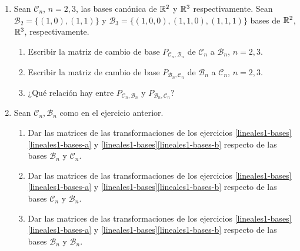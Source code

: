 \begin{enumerate}[topsep=6pt, itemsep=.4cm]
\item\label{otras bases} Sean $\mathcal{C}_n$, $n=2,3$, las bases canónica de $\mathbb R^2$ y $\mathbb R^3$ respectivamente. Sean
$\mathcal{B}_2=\{(1,0),(1,1)\}$ y $\mathcal{B}_3=\{(1,0,0),(1,1,0),(1,1,1)\}$ bases de $\mathbb R^2$, $\mathbb R^3$, respectivamente.
\begin{enumerate}
    \item Escribir la matriz de cambio de base $P_{{\mathcal{C}_n},{\mathcal{B}_n}}$ de $\mathcal{C}_n$ a $\mathcal{B}_n$, $n=2,3$.
    \item Escribir la matriz de cambio de base $P_{{\mathcal{B}_n},{\mathcal{C}_n}}$ de $\mathcal{B}_n$ a $\mathcal{C}_n$, $n=2,3$.
    \item ¿Qué relación hay entre $P_{{\mathcal{C}_n},{\mathcal{B}_n}}$ y $P_{{\mathcal{B}_n},{\mathcal{C}_n}}$?
\end{enumerate}


\item \label{basesRn} Sean $\mathcal{C}_n, \mathcal{B}_n$ como en el ejercicio anterior.
\begin{enumerate}
    \item Dar las matrices de las transformaciones de los ejercicios  \ref{lineales1-bases}\ref{lineales1-bases-a}  y \ref{lineales1-bases}\ref{lineales1-bases-b} respecto de las bases $\mathcal{B}_n$ y
    $\mathcal{C}_n$.
    \item Dar las matrices de las transformaciones  de los ejercicios  \ref{lineales1-bases}\ref{lineales1-bases-a}  y \ref{lineales1-bases}\ref{lineales1-bases-b} respecto de las bases $\mathcal{C}_n$ y
    $\mathcal{B}_n$.
    \item Dar las matrices de las transformaciones  de los ejercicios  \ref{lineales1-bases}\ref{lineales1-bases-a}  y \ref{lineales1-bases}\ref{lineales1-bases-b} respecto de las bases $\mathcal{B}_n$ y
    $\mathcal{B}_n$.
\end{enumerate}




\end{enumerate}


